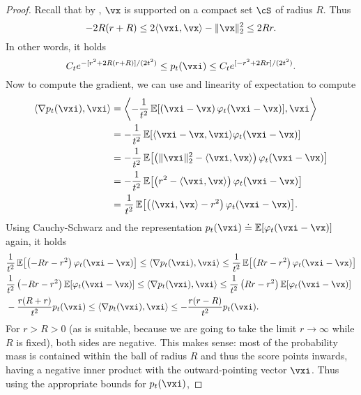 \documentclass[../../book-main.tex]{subfiles}
\begin{document}
\begin{proof}
    Recall that by , \(\vx\) is supported on a compact set \(\cS\) of radius \(R\). Thus 
    \begin{equation}
        -2R(r + R) \leq 2\ip{\vxi}{\vx} - \norm{\vx}_{2}^{2} \leq 2Rr.
    \end{equation}
    In other words, it holds
    \begin{equation}
        C_{t}e^{-[r^{2} + 2R(r + R)]/(2t^{2})} \leq p_{t}(\vxi) \leq C_{t}e^{[-r^{2} + 2Rr]/(2t^{2})}.
    \end{equation}
    Now to compute the gradient, we can use  and linearity of expectation to compute
    \begin{align}
        \ip{\nabla p_{t}(\vxi)}{\vxi}
        &= \ip*{-\frac{1}{t^{2}}\Ex\rs{\bp{\vxi - \vx}\phi_{t}(\vxi - \vx)}}{\vxi} \\
        &= -\frac{1}{t^{2}}\Ex\rs{\ip{\vxi - \vx}{\vxi}\phi_{t}(\vxi - \vx)} \\
        &= -\frac{1}{t^{2}}\Ex\rs{\bp{\norm{\vxi}_{2}^{2} - \ip{\vxi}{\vx}}\phi_{t}(\vxi - \vx)} \\
        &= -\frac{1}{t^{2}}\Ex\rs{\bp{r^{2} - \ip{\vxi}{\vx}}\phi_{t}(\vxi - \vx)} \\
        &= \frac{1}{t^{2}}\Ex\rs{\bp{\ip{\vxi}{\vx} - r^{2}}\phi_{t}(\vxi - \vx)}.
    \end{align}
    Using Cauchy-Schwarz and the representation \(p_{t}(\vxi) \doteq \Ex[\phi_{t}(\vxi - \vx)]\) again, it holds
    \begin{align}
        &\frac{1}{t^{2}}\Ex\rs{\bp{-Rr - r^{2}}\phi_{t}(\vxi - \vx)} \leq \ip{\nabla p_{t}(\vxi)}{\vxi} \leq \frac{1}{t^{2}}\Ex\rs{\bp{Rr - r^{2}}\phi_{t}(\vxi - \vx)} \\
        &\frac{1}{t^{2}}\bp{-Rr - r^{2}}\Ex\rs{\phi_{t}(\vxi - \vx)} \leq \ip{\nabla p_{t}(\vxi)}{\vxi} \leq \frac{1}{t^{2}}\bp{Rr - r^{2}}\Ex\rs{\phi_{t}(\vxi - \vx)} \\
        &-\frac{r(R + r)}{t^{2}}p_{t}(\vxi) \leq \ip{\nabla p_{t}(\vxi)}{\vxi} \leq -\frac{r(r - R)}{t^{2}}p_{t}(\vxi).
    \end{align}
    For \(r > R > 0\) (as is suitable, because we are going to take the limit \(r \to \infty\) while \(R\) is fixed), both sides are negative. This makes sense: most of the probability mass is contained within the ball of radius \(R\) and thus the score points inwards, having a negative inner product with the outward-pointing vector \(\vxi\). Thus using the appropriate bounds for \(p_{t}(\vxi)\),

\end{proof}
\end{document}
